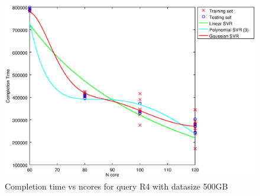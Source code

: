 
\begin {figure}[hbtp]
\centering
\includegraphics[width=\textwidth]{output/R4_500_ONLY_1_OVER_NCORES/plot_R4_500_bestmodels.eps}
\caption{Completion time vs ncores for query R4 with datasize 500GB}
\label{fig:all_nonlinear_R4_500}
\end {figure}
